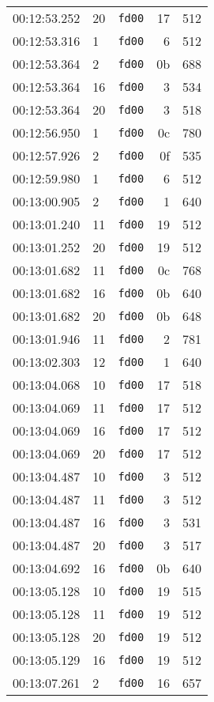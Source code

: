 \documentclass{article}
\begin{document}
\begin{longtable}{lllrr}
00:12:53.252 & 20 & \texttt{fd00} & 17 & 512 \\
00:12:53.316 & 1 & \texttt{fd00} & 6 & 512 \\
00:12:53.364 & 2 & \texttt{fd00} & 0b & 688 \\
00:12:53.364 & 16 & \texttt{fd00} & 3 & 534 \\
00:12:53.364 & 20 & \texttt{fd00} & 3 & 518 \\
00:12:56.950 & 1 & \texttt{fd00} & 0c & 780 \\
00:12:57.926 & 2 & \texttt{fd00} & 0f & 535 \\
00:12:59.980 & 1 & \texttt{fd00} & 6 & 512 \\
00:13:00.905 & 2 & \texttt{fd00} & 1 & 640 \\
00:13:01.240 & 11 & \texttt{fd00} & 19 & 512 \\
00:13:01.252 & 20 & \texttt{fd00} & 19 & 512 \\
00:13:01.682 & 11 & \texttt{fd00} & 0c & 768 \\
00:13:01.682 & 16 & \texttt{fd00} & 0b & 640 \\
00:13:01.682 & 20 & \texttt{fd00} & 0b & 648 \\
00:13:01.946 & 11 & \texttt{fd00} & 2 & 781 \\
00:13:02.303 & 12 & \texttt{fd00} & 1 & 640 \\
00:13:04.068 & 10 & \texttt{fd00} & 17 & 518 \\
00:13:04.069 & 11 & \texttt{fd00} & 17 & 512 \\
00:13:04.069 & 16 & \texttt{fd00} & 17 & 512 \\
00:13:04.069 & 20 & \texttt{fd00} & 17 & 512 \\
00:13:04.487 & 10 & \texttt{fd00} & 3 & 512 \\
00:13:04.487 & 11 & \texttt{fd00} & 3 & 512 \\
00:13:04.487 & 16 & \texttt{fd00} & 3 & 531 \\
00:13:04.487 & 20 & \texttt{fd00} & 3 & 517 \\
00:13:04.692 & 16 & \texttt{fd00} & 0b & 640 \\
00:13:05.128 & 10 & \texttt{fd00} & 19 & 515 \\
00:13:05.128 & 11 & \texttt{fd00} & 19 & 512 \\
00:13:05.128 & 20 & \texttt{fd00} & 19 & 512 \\
00:13:05.129 & 16 & \texttt{fd00} & 19 & 512 \\
00:13:07.261 & 2 & \texttt{fd00} & 16 & 657 \\

\end{longtable}
\end{document}
